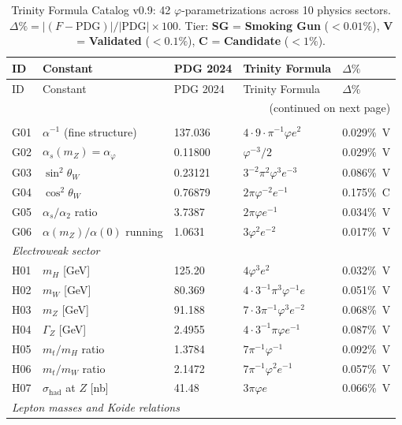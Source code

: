 \documentclass[10pt,a4paper]{article}
\begin{document}
\begin{longtable}{@{}lp{3.0cm}lp{4.5cm}l@{}}
\caption{Trinity Formula Catalog v0.9: 42 $\varphi$-parametrizations across 10 physics sectors.
$\Delta\% = |(F-\text{PDG})|/|\text{PDG}| \times 100$. Tier: \textbf{SG} = \textbf{Smoking Gun} ($<0.01\%$),
\textbf{V} = \textbf{Validated} ($<0.1\%$), \textbf{C} = \textbf{Candidate} ($<1\%$).}
\label{tab:catalog}\\
\toprule
ID & Constant & PDG 2024 & Trinity Formula & $\Delta\%$ \\
\midrule
\endfirsthead
\toprule
ID & Constant & PDG 2024 & Trinity Formula & $\Delta\%$ \\
\midrule
\endhead
\midrule\multicolumn{5}{r}{\small(continued on next page)}\\
\endfoot
\bottomrule
\endlastfoot
\multicolumn{5}{l}{\textit{Gauge / Running coupling sector}}\\
G01 & $\alpha^{-1}$ (fine structure) & 137.036 & $4{\cdot}9{\cdot}\pi^{-1}\varphi e^2$ & 0.029\%~V \\
G02 & $\alpha_s(m_Z) = \alpha_\varphi$ & 0.11800 & $\varphi^{-3}/2$ & 0.029\%~V \\
G03 & $\sin^2\theta_W$ & 0.23121 & $3^{-2}\pi^2\varphi^3 e^{-3}$ & 0.086\%~V \\
G04 & $\cos^2\theta_W$ & 0.76879 & $2\pi\varphi^{-2}e^{-1}$ & 0.175\%~C \\
G05 & $\alpha_s/\alpha_2$ ratio & 3.7387 & $2\pi\varphi e^{-1}$ & 0.034\%~V \\
G06 & $\alpha(m_Z)/\alpha(0)$ running & 1.0631 & $3\varphi^2 e^{-2}$ & 0.017\%~V \\
\midrule
\multicolumn{5}{l}{\textit{Electroweak sector}}\\
H01 & $m_H$ [GeV] & 125.20 & $4\varphi^3 e^2$ & 0.032\%~V \\
H02 & $m_W$ [GeV] & 80.369 & $4{\cdot}3^{-1}\pi^3\varphi^{-1}e$ & 0.051\%~V \\
H03 & $m_Z$ [GeV] & 91.188 & $7{\cdot}3\pi^{-1}\varphi^3 e^{-2}$ & 0.068\%~V \\
H04 & $\Gamma_Z$ [GeV] & 2.4955 & $4{\cdot}3^{-1}\pi\varphi e^{-1}$ & 0.087\%~V \\
H05 & $m_t/m_H$ ratio & 1.3784 & $7\pi^{-1}\varphi^{-1}$ & 0.092\%~V \\
H06 & $m_t/m_W$ ratio & 2.1472 & $7\pi^{-1}\varphi^2 e^{-1}$ & 0.057\%~V \\
H07 & $\sigma_{\mathrm{had}}$ at $Z$ [nb] & 41.48 & $3\pi\varphi e$ & 0.066\%~V \\
\midrule
\multicolumn{5}{l}{\textit{Lepton masses and Koide relations}}\\

\end{longtable}
\end{document}
